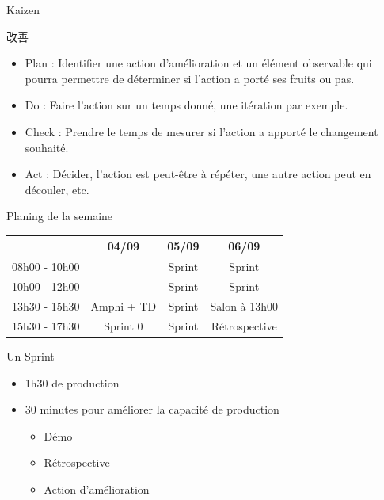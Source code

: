 \documentclass{beamer}
\begin{document}
\begin{frame}{Kaizen 
    {\begin{CJK*}{UTF8}{mj} 改善 \end{CJK*}}
  }
  
  \begin{itemize}
    \item \alert{Plan} : Identifier une action d'amélioration et un élément observable qui pourra permettre de déterminer si l'action a porté ses fruits ou pas.
    \item \alert{Do} : Faire l'action sur un temps donné, une itération par exemple.
    \item \alert{Check} : Prendre le temps de mesurer si l'action a apporté le changement souhaité.
    \item \alert{Act} : Décider, l'action est peut-être à répéter, une autre action peut en découler, etc.
  \end{itemize}

\end{frame}


\begin{frame}{Planing de la semaine}{}
  {
    \center
    \begin{tabular}{l | g | g | g  }
      & \textbf{04/09} & \textbf{05/09} & \textbf{06/09} \\
      \hline
      08h00 - 10h00 &          & Sprint & Sprint \\
      \hline
      10h00 - 12h00 &          & Sprint & Sprint \\
      \hline
      13h30 - 15h30 & Amphi + TD & Sprint & Salon à 13h00 \\
      \hline
      15h30 - 17h30 & Sprint 0 & Sprint & Rétrospective \\
      \hline
    \end{tabular}
  }

\end{frame}

\begin{frame}{Un Sprint}
  \begin{itemize}
    \item 1h30 de production
    \item 30 minutes pour améliorer la capacité de production
    \begin{itemize}
      \item Démo 
      \item Rétrospective 
      \item Action d'amélioration
    \end{itemize}
  \end{itemize}
\end{frame}
\end{document}
